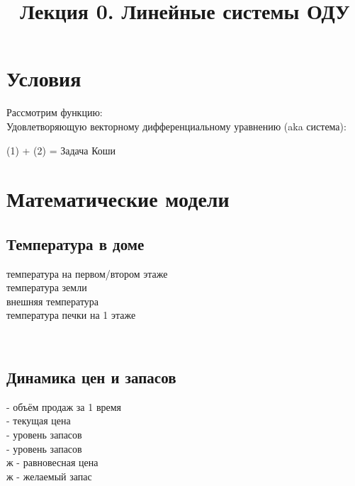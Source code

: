 \documentclass[
]{article}
\title{Лекция 0. Линейные системы ОДУ}
\author{}
\date{}
\begin{document}
\maketitle

\section{Условия}\label{ux443ux441ux43bux43eux432ux438ux44f}

Рассмотрим функцию:\\
{}Удовлетворяющую векторному дифференциальному уравнению (aka
система):\\
{}{}{}

{}

{}{}

(1) + (2) = Задача Коши

\section{Математические
модели}\label{ux43cux430ux442ux435ux43cux430ux442ux438ux447ux435ux441ux43aux438ux435-ux43cux43eux434ux435ux43bux438}

\subsection{Температура в
доме}\label{ux442ux435ux43cux43fux435ux440ux430ux442ux443ux440ux430-ux432-ux434ux43eux43cux435}

{}температура на первом/втором этаже\\
{} температура земли\\
{}внешняя температура\\
{}температура печки на 1 этаже

{}\strut \\
{}

\subsection{Динамика цен и
запасов}\label{ux434ux438ux43dux430ux43cux438ux43aux430-ux446ux435ux43d-ux438-ux437ux430ux43fux430ux441ux43eux432}

{} - объём продаж за 1 время\\
{} - текущая цена\\
{} - уровень запасов\\
{} - уровень запасов\\
{ж} - равновесная цена\\
{ж} - желаемый запас
\end{document}
